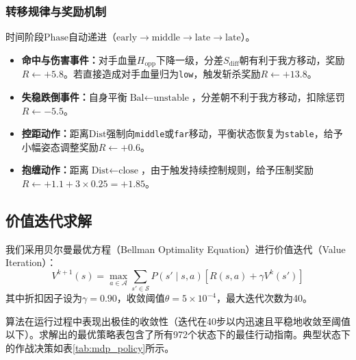 \documentclass[a4paper,12pt]{article}
\numberwithin{equation}{section}
\numberwithin{table}{section}
\numberwithin{figure}{section}
\begin{document}
\subsubsection{转移规律与奖励机制}

时间阶段$\text{Phase}$自动递进（$\text{early} \rightarrow \text{middle} \rightarrow \text{late} \rightarrow \text{late}$）。
\begin{itemize}
    \item \textbf{命中与伤害事件：}对手血量$H_{\text{opp}}$下降一级，分差$S_{\text{diff}}$朝有利于我方移动，奖励$R \leftarrow +5.8$。若直接造成对手血量归为\texttt{low}，触发斩杀奖励$R \leftarrow +13.8$。
    \item \textbf{失稳跌倒事件：}自身平衡$\text{Bal} \leftarrow \text{unstable}$，分差朝不利于我方移动，扣除惩罚$R \leftarrow -5.5$。
    \item \textbf{控距动作：}距离$\text{Dist}$强制向\texttt{middle}或\texttt{far}移动，平衡状态恢复为\texttt{stable}，给予小幅姿态调整奖励$R \leftarrow +0.6$。
    \item \textbf{抱缠动作：}距离$\text{Dist} \leftarrow \text{close}$，由于触发持续控制规则，给予压制奖励$R \leftarrow +1.1 + 3 \times 0.25 = +1.85$。
\end{itemize}

\subsection{价值迭代求解}

我们采用贝尔曼最优方程（Bellman Optimality Equation）进行价值迭代（Value Iteration）：
\begin{equation}
    V^{k+1}(s) = \max_{a \in \mathcal{A}} \sum_{s' \in \mathcal{S}} P(s' \mid s, a) \left[ R(s, a) + \gamma V^k(s') \right]
    \label{eq:bellman}
\end{equation}
其中折扣因子设为$\gamma = 0.90$，收敛阈值$\theta = 5 \times 10^{-4}$，最大迭代次数为40。

算法在运行过程中表现出极佳的收敛性（迭代在40步以内迅速且平稳地收敛至阈值以下）。求解出的最优策略表包含了所有972个状态下的最佳行动指南。典型状态下的作战决策如表\ref{tab:mdp_policy}所示。
\end{document}
